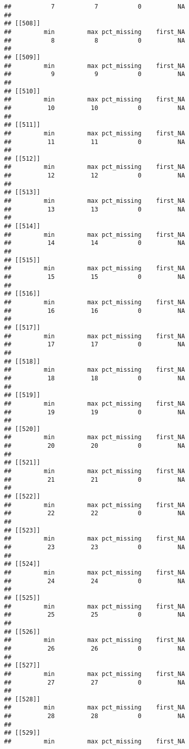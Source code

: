 \documentclass[
]{article}
\begin{document}
\begin{verbatim}
##           7           7           0          NA 
## 
## [[508]]
##         min         max pct_missing    first_NA 
##           8           8           0          NA 
## 
## [[509]]
##         min         max pct_missing    first_NA 
##           9           9           0          NA 
## 
## [[510]]
##         min         max pct_missing    first_NA 
##          10          10           0          NA 
## 
## [[511]]
##         min         max pct_missing    first_NA 
##          11          11           0          NA 
## 
## [[512]]
##         min         max pct_missing    first_NA 
##          12          12           0          NA 
## 
## [[513]]
##         min         max pct_missing    first_NA 
##          13          13           0          NA 
## 
## [[514]]
##         min         max pct_missing    first_NA 
##          14          14           0          NA 
## 
## [[515]]
##         min         max pct_missing    first_NA 
##          15          15           0          NA 
## 
## [[516]]
##         min         max pct_missing    first_NA 
##          16          16           0          NA 
## 
## [[517]]
##         min         max pct_missing    first_NA 
##          17          17           0          NA 
## 
## [[518]]
##         min         max pct_missing    first_NA 
##          18          18           0          NA 
## 
## [[519]]
##         min         max pct_missing    first_NA 
##          19          19           0          NA 
## 
## [[520]]
##         min         max pct_missing    first_NA 
##          20          20           0          NA 
## 
## [[521]]
##         min         max pct_missing    first_NA 
##          21          21           0          NA 
## 
## [[522]]
##         min         max pct_missing    first_NA 
##          22          22           0          NA 
## 
## [[523]]
##         min         max pct_missing    first_NA 
##          23          23           0          NA 
## 
## [[524]]
##         min         max pct_missing    first_NA 
##          24          24           0          NA 
## 
## [[525]]
##         min         max pct_missing    first_NA 
##          25          25           0          NA 
## 
## [[526]]
##         min         max pct_missing    first_NA 
##          26          26           0          NA 
## 
## [[527]]
##         min         max pct_missing    first_NA 
##          27          27           0          NA 
## 
## [[528]]
##         min         max pct_missing    first_NA 
##          28          28           0          NA 
## 
## [[529]]
##         min         max pct_missing    first_NA 

\end{verbatim}
\end{document}
